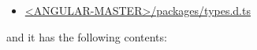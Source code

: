 \begin{itemize}
  \item \href{https://github.com/angular/angular/blob/master/modules/types.d.ts}
        {<ANGULAR-MASTER>/packages/types.d.ts}
\end{itemize}

and it has the following contents:






